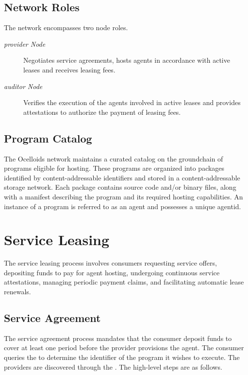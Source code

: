 \documentclass{oc}
\begin{document}
\subsection{Network Roles}\label{sec:network-roles}

The network encompasses two node roles.
\begin{description}
  \item[\emph{\Gls*{provider} Node}] Negotiates service agreements, hosts \glspl{agent} in accordance with active leases and receives leasing fees.
  \item[\emph{\Gls*{auditor} Node}] Verifies the execution of the \glspl{agent} involved in active leases and provides attestations to authorize the payment of leasing fees.
\end{description}

\subsection{Program Catalog}\label{sec:programs}

The Ocelloids network maintains a curated catalog on the \gls{groundchain} of programs eligible for hosting.
These programs are organized into packages identified by content-addressable identifiers and stored in a content-addressable storage network. 
Each package contains source code and/or binary files, along with a manifest describing the program and its required hosting capabilities.
An instance of a program is referred to as an \gls{agent} and possesses a unique \gls{agentid}.


\section{Service Leasing}\label{sec:leasing}

The service leasing process involves consumers requesting service offers, depositing funds to pay for \gls{agent} hosting, undergoing continuous service attestations, managing periodic payment claims, and facilitating automatic lease renewals.

\subsection{Service Agreement}\label{sec:service-agreement}

The service agreement process mandates that the \gls{consumer} deposit funds to cover at least one period before the \gls{provider} provisions the \gls{agent}.
The \gls{consumer} queries the  to determine the identifier of the program it wishes to execute.
The \glspl{provider} are discovered through the .
The high-level steps are as follows.
\end{document}
